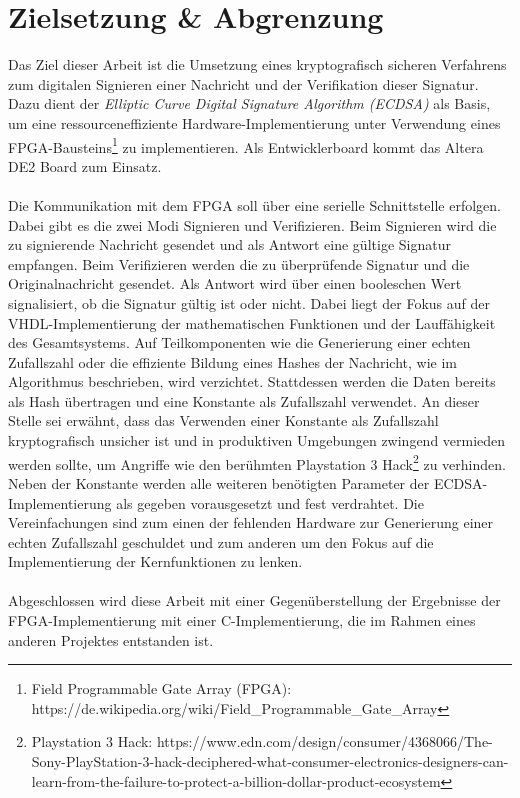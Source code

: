 
\chapter{Zielsetzung \& Abgrenzung} 
\label{sec:planung}
Das Ziel dieser Arbeit ist die Umsetzung eines kryptografisch sicheren Verfahrens zum digitalen Signieren einer Nachricht und der Verifikation dieser Signatur. Dazu dient der \textit{Elliptic Curve Digital Signature Algorithm (ECDSA)} als Basis, um eine ressourceneffiziente Hardware-Implementierung unter Verwendung eines FPGA-Bausteins\footnote{Field Programmable Gate Array (FPGA): https://de.wikipedia.org/wiki/Field\_Programmable\_Gate\_Array} zu implementieren. Als Entwicklerboard kommt das Altera DE2 Board zum Einsatz. 
\\ \\
Die Kommunikation mit dem FPGA soll über eine serielle Schnittstelle erfolgen. Dabei gibt es die zwei Modi Signieren und Verifizieren. Beim Signieren wird die zu signierende Nachricht gesendet und als Antwort eine gültige Signatur empfangen. Beim Verifizieren werden die zu überprüfende Signatur und die Originalnachricht gesendet. Als Antwort wird über einen booleschen Wert signalisiert, ob die Signatur gültig ist oder nicht. Dabei liegt der Fokus auf der VHDL-Implementierung der mathematischen Funktionen und der Lauffähigkeit des Gesamtsystems. Auf Teilkomponenten wie die Generierung einer echten Zufallszahl oder die effiziente Bildung eines Hashes der Nachricht, wie im Algorithmus beschrieben, wird verzichtet. Stattdessen werden die Daten bereits als Hash übertragen und eine Konstante als Zufallszahl verwendet. An dieser Stelle sei erwähnt, dass das Verwenden einer Konstante als Zufallszahl kryptografisch unsicher ist und in produktiven Umgebungen zwingend vermieden werden sollte, um Angriffe wie den berühmten Playstation 3 Hack\footnote{Playstation 3 Hack: https://www.edn.com/design/consumer/4368066/The-Sony-PlayStation-3-hack-deciphered-what-consumer-electronics-designers-can-learn-from-the-failure-to-protect-a-billion-dollar-product-ecosystem} zu verhinden. Neben der Konstante werden alle weiteren benötigten Parameter der ECDSA-Implementierung als gegeben vorausgesetzt und fest verdrahtet. Die Vereinfachungen sind zum einen der fehlenden Hardware zur Generierung einer echten Zufallszahl geschuldet und zum anderen um den Fokus auf die Implementierung der Kernfunktionen zu lenken.  
\\ \\
Abgeschlossen wird diese Arbeit mit einer Gegenüberstellung der Ergebnisse der FPGA-Implementierung mit einer C-Implementierung, die im Rahmen eines anderen Projektes \cite{kewish} entstanden ist.



